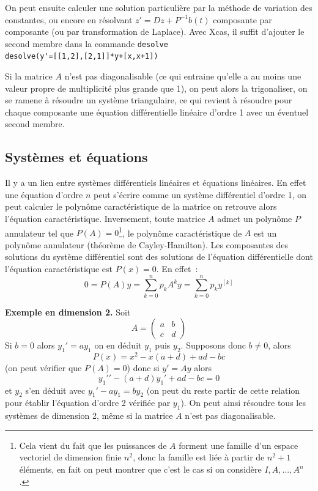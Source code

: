 \documentclass[a4paper,11pt]{book}
\begin{document}
\begin{giacjshere}
On peut ensuite calculer une solution particuli\`ere par la m\'ethode
de variation des constantes, ou encore en r\'esolvant 
$z'=Dz+P^{-1}b(t)$ composante par composante (ou par transformation
de Laplace). Avec Xcas,
il suffit d'ajouter le second membre dans la commande \verb|desolve|\\
\verb|desolve(y'=[[1,2],[2,1]]*y+[x,x+1])|

Si la matrice $A$ n'est pas diagonalisable (ce qui entraine
qu'elle a au moins une valeur propre de
multiplicit\'e plus grande que 1), on peut alors
la trigonaliser, on se ramene \`a r\'esoudre un syst\`eme
triangulaire, ce qui revient \`a r\'esoudre pour chaque
composante une \'equation
diff\'erentielle lin\'eaire d'ordre 1 avec un \'eventuel 
second membre. 

\subsection{Syst\`emes et \'equations}
Il y a un lien entre syst\`emes diff\'erentiels lin\'eaires
et \'equations lin\'eaires. En effet une \'equation d'ordre $n$ peut
s'\'ecrire comme un syst\`eme diff\'erentiel d'ordre 1,
on peut calculer le polyn\^ome caract\'eristique de la matrice
on retrouve alors l'\'equation caract\'eristique. Inversement,
toute matrice $A$ admet un polyn\^ome $P$
annulateur tel que $P(A)=0$\footnote{Cela vient du fait que
les puissances de $A$ forment une famille d'un
espace vectoriel de dimension finie $n^2$, donc la famille est li\'ee
\`a partir de $n^2+1$ \'el\'ements, en fait on peut montrer
que c'est le cas si on consid\`ere $I,A,...,A^n$.},
le polyn\^ome caract\'eristique de $A$ est un polyn\^ome annulateur
(th\'eor\`eme de Cayley-Hamilton).
Les composantes des solutions du syst\`eme diff\'erentiel sont des 
solutions de l'\'equation diff\'erentielle dont l'\'equation
caract\'eristique est $P(x)=0$. En effet~:
$$0=P(A)y=\sum_{k=0}^n p_k A^k y = \sum_{k=0}^n p_k y^{[k]}$$

{\bf Exemple en dimension 2.}
Soit $$A=\left(\begin{array}{cc}
a & b \\
c & d
\end{array}\right) $$
Si $b=0$ alors $y_1'=ay_1$ on en d\'eduit
$y_1$ puis $y_2$. Supposons donc $b\neq 0$, alors
$$ P(x)=x^{2} - x (a+d) +a d-b c$$
(on peut v\'erifier que $P(A)=0$)
donc si $y'=Ay$ alors 
$$ y_1'{'}-(a+d)y_1'+ad-bc=0$$
et $y_2$ s'en d\'eduit avec $y_1'-ay_1=by_2$ (on peut du reste
partir de cette relation pour \'etablir l'\'equation d'ordre 2
v\'erifi\'ee par $y_1$). On peut ainsi
r\'esoudre tous les syst\`emes de dimension 2, m\^eme
si la matrice $A$ n'est pas diagonalisable.


\end{giacjshere}
\end{document}
